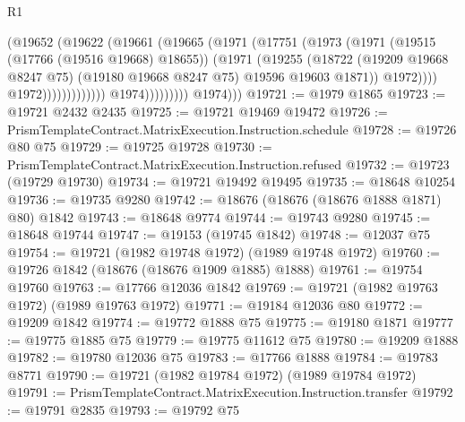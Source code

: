 \begin{lexlean}{R1}
\begin{coremodule}
                                            (@19652
                                              (@19622
                                                (@19661
                                                  (@19665
                                                    (@1971
                                                      (@17751
                                                        (@1973
                                                          (@1971
                                                            (@19515 (@17766 (@19516 @19668) @18655))
                                                            (@1971
                                                              (@19255
                                                                (@18722
                                                                  (@19209 @19668 @8247 @75)
                                                                  (@19180 @19668 @8247 @75)
                                                                  @19596
                                                                  @19603
                                                                  @1871))
                                                              @1972))))
                                                      @1972)))))))))))))
                            @1974)))))))))
          @1974)))
@19721 := @1979 @1865
@19723 := @19721 @2432 @2435
@19725 := @19721 @19469 @19472
@19726 := PrismTemplateContract.MatrixExecution.Instruction.schedule
@19728 := @19726 @80 @75
@19729 := @19725 @19728
@19730 := PrismTemplateContract.MatrixExecution.Instruction.refused
@19732 := @19723 (@19729 @19730)
@19734 := @19721 @19492 @19495
@19735 := @18648 @10254
@19736 := @19735 @9280
@19742 := @18676 (@18676 (@18676 @1888 @1871) @80) @1842
@19743 := @18648 @9774
@19744 := @19743 @9280
@19745 := @18648 @19744
@19747 := @19153 (@19745 @1842)
@19748 := @12037 @75
@19754 := @19721 (@1982 @19748 @1972) (@1989 @19748 @1972)
@19760 := @19726 @1842 (@18676 (@18676 @1909 @1885) @1888)
@19761 := @19754 @19760
@19763 := @17766 @12036 @1842
@19769 := @19721 (@1982 @19763 @1972) (@1989 @19763 @1972)
@19771 := @19184 @12036 @80
@19772 := @19209 @1842
@19774 := @19772 @1888 @75
@19775 := @19180 @1871
@19777 := @19775 @1885 @75
@19779 := @19775 @11612 @75
@19780 := @19209 @1888
@19782 := @19780 @12036 @75
@19783 := @17766 @1888
@19784 := @19783 @8771
@19790 := @19721 (@1982 @19784 @1972) (@1989 @19784 @1972)
@19791 := PrismTemplateContract.MatrixExecution.Instruction.transfer
@19792 := @19791 @2835
@19793 := @19792 @75

\end{coremodule}
\end{lexlean}
